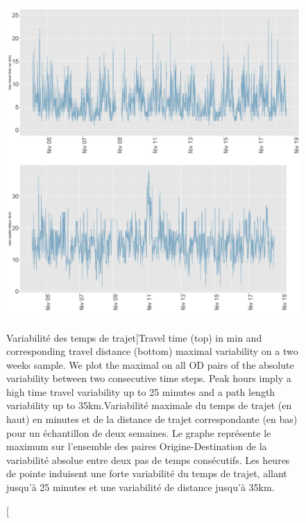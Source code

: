 \begin{figure}
\includegraphics[width=\linewidth]{Figures/Final/8-1-2-fig-transportationequilibrium-fig-3.jpg}
\caption[Variability of travel time and distance][Variabilité des temps de trajet]{Travel time (top) in min and corresponding travel distance (bottom) maximal variability on a two weeks sample. We plot the maximal on all OD pairs of the absolute variability between two consecutive time steps. Peak hours imply a high time travel variability up to 25 minutes and a path length variability up to 35km.\label{fig:transportationequilibrium:fig-3}}{Variabilité maximale du temps de trajet (en haut) en minutes et de la distance de trajet correspondante (en bas) pour un échantillon de deux semaines. Le graphe représente le maximum sur l'ensemble des paires Origine-Destination de la variabilité absolue entre deux pas de temps consécutifs. Les heures de pointe induisent une forte variabilité du temps de trajet, allant jusqu'à 25 minutes et une variabilité de distance jusqu'à 35km.\label{fig:transportationequilibrium:fig-3}}
\end{figure}

